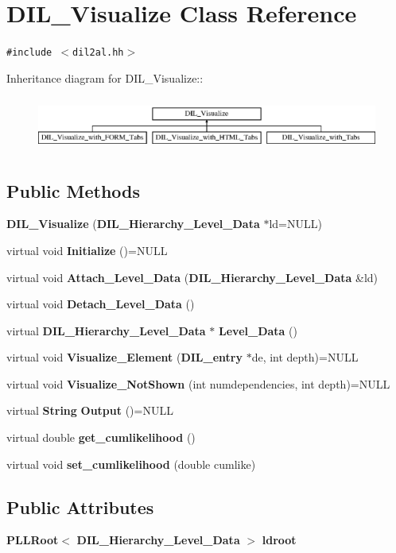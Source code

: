 \section{DIL\_\-Visualize  Class Reference}
\label{classDIL__Visualize}
{\tt \#include $<$dil2al.hh$>$}

Inheritance diagram for DIL\_\-Visualize::\begin{figure}[H]
\begin{center}
\leavevmode
\includegraphics[height=1.83007cm]{classDIL__Visualize}
\end{center}
\end{figure}
\subsection*{Public Methods}
\begin{CompactItemize}
\item 
{\bf DIL\_\-Visualize} ({\bf DIL\_\-Hierarchy\_\-Level\_\-Data} $\ast$ld=NULL)
\item 
virtual void {\bf Initialize} ()=NULL
\item 
virtual void {\bf Attach\_\-Level\_\-Data} ({\bf DIL\_\-Hierarchy\_\-Level\_\-Data} \&ld)
\item 
virtual void {\bf Detach\_\-Level\_\-Data} ()
\item 
virtual {\bf DIL\_\-Hierarchy\_\-Level\_\-Data} $\ast$ {\bf Level\_\-Data} ()
\item 
virtual void {\bf Visualize\_\-Element} ({\bf DIL\_\-entry} $\ast$de, int depth)=NULL
\item 
virtual void {\bf Visualize\_\-Not\-Shown} (int numdependencies, int depth)=NULL
\item 
virtual {\bf String} {\bf Output} ()=NULL
\item 
virtual double {\bf get\_\-cumlikelihood} ()
\item 
virtual void {\bf set\_\-cumlikelihood} (double cumlike)
\end{CompactItemize}
\subsection*{Public Attributes}
\begin{CompactItemize}
\item 
{\bf PLLRoot}$<$ {\bf DIL\_\-Hierarchy\_\-Level\_\-Data} $>$ {\bf ldroot}
\end{CompactItemize}
